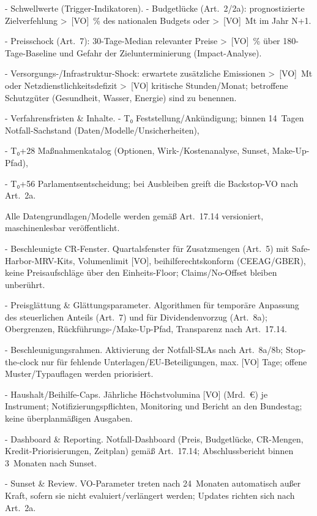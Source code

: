\documentclass[12pt,a4paper]{scrartcl}
\begin{document}
- Schwellwerte (Trigger-Indikatoren).
- Budgetlücke (Art. 2/2a): prognostizierte Zielverfehlung > [VO] \% des nationalen Budgets oder > [VO] Mt im Jahr N+1.

- Preisschock (Art. 7): 30-Tage-Median relevanter Preise > [VO] \% über 180-Tage-Baseline und Gefahr der Zielunterminierung (Impact-Analyse).

- Versorgungs-/Infrastruktur-Shock: erwartete zusätzliche Emissionen > [VO] Mt oder Netzdienstlichkeitsdefizit > [VO] kritische Stunden/Monat; betroffene Schutzgüter (Gesundheit, Wasser, Energie) sind zu benennen.

- Verfahrensfristen \& Inhalte.
- T₀ Feststellung/Ankündigung; binnen 14 Tagen Notfall-Sachstand (Daten/Modelle/Unsicherheiten),

- T₀+28 Maßnahmenkatalog (Optionen, Wirk-/Kostenanalyse, Sunset, Make-Up-Pfad),

- T₀+56 Parlamentsentscheidung; bei Ausbleiben greift die Backstop-VO nach Art. 2a.

    Alle Datengrundlagen/Modelle werden gemäß Art. 17.14 versioniert, maschinenlesbar veröffentlicht.

- Beschleunigte CR-Fenster. Quartalsfenster für Zusatzmengen (Art. 5) mit Safe-Harbor-MRV-Kits, Volumenlimit [VO], beihilferechtskonform (CEEAG/GBER), keine Preisaufschläge über den Einheits-Floor; Claims/No-Offset bleiben unberührt.

- Preisglättung \& Glättungsparameter. Algorithmen für temporäre Anpassung des steuerlichen Anteils (Art. 7) und für Dividendenvorzug (Art. 8a); Obergrenzen, Rückführungs-/Make-Up-Pfad, Transparenz nach Art. 17.14.

- Beschleunigungsrahmen. Aktivierung der Notfall-SLAs nach Art. 8a/8b; Stop-the-clock nur für fehlende Unterlagen/EU-Beteiligungen, max. [VO] Tage; offene Muster/Typauflagen werden priorisiert.

- Haushalt/Beihilfe-Caps. Jährliche Höchstvolumina [VO] (Mrd. €) je Instrument; Notifizierungspflichten, Monitoring und Bericht an den Bundestag; keine überplanmäßigen Ausgaben.

- Dashboard \& Reporting. Notfall-Dashboard (Preis, Budgetlücke, CR-Mengen, Kredit-Priorisierungen, Zeitplan) gemäß Art. 17.14; Abschlussbericht binnen 3 Monaten nach Sunset.

- Sunset \& Review. VO-Parameter treten nach 24 Monaten automatisch außer Kraft, sofern sie nicht evaluiert/verlängert werden; Updates richten sich nach Art. 2a.
\end{document}
